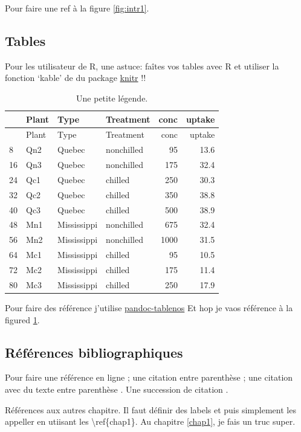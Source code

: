 Pour faire une ref à la figure \ref{fig:intr1}.

\subsection*{Tables}\label{tables}

Pour les utilisateur de R, une astuce: faîtes vos tables avec R et
utiliser la fonction `kable' de du package
\href{http://yihui.name/knitr/}{knitr} !!

\begin{longtable}[]{@{}llllrr@{}}
\caption{Une petite légende. \label{tbl:intr_1}}\tabularnewline
\toprule
& Plant & Type & Treatment & conc & uptake\tabularnewline
\midrule
\endfirsthead
\toprule
& Plant & Type & Treatment & conc & uptake\tabularnewline
\midrule
\endhead
8 & Qn2 & Quebec & nonchilled & 95 & 13.6\tabularnewline
16 & Qn3 & Quebec & nonchilled & 175 & 32.4\tabularnewline
24 & Qc1 & Quebec & chilled & 250 & 30.3\tabularnewline
32 & Qc2 & Quebec & chilled & 350 & 38.8\tabularnewline
40 & Qc3 & Quebec & chilled & 500 & 38.9\tabularnewline
48 & Mn1 & Mississippi & nonchilled & 675 & 32.4\tabularnewline
56 & Mn2 & Mississippi & nonchilled & 1000 & 31.5\tabularnewline
64 & Mc1 & Mississippi & chilled & 95 & 10.5\tabularnewline
72 & Mc2 & Mississippi & chilled & 175 & 11.4\tabularnewline
80 & Mc3 & Mississippi & chilled & 250 & 17.9\tabularnewline
\bottomrule
\end{longtable}

Pour faire des référence j'utilise
\href{https://github.com/tomduck/pandoc-tablenos}{pandoc-tablenos} Et
hop je vaos référence à la figured \ref{tbl:intr_1}.

\subsection*{Références
bibliographiques}\label{ruxe9fuxe9rences-bibliographiques}

Pour faire une référence en ligne \citet{Cazelles2016a}; une citation
entre parenthèse \citep{Cazelles2016a}; une citation avec du texte entre
parenthèse \citep[voir][]{Cazelles2016a}. Une succession de citation
\citep{Cazelles2016a, MacArthur1967, DeRuiter1995}.

Références aux autres chapitre. Il faut définir des labels et puis
simplement les appeller en utiisant les \textbackslash{}ref\{chap1\}. Au
chapitre \ref{chap1}, je fais un truc super.

